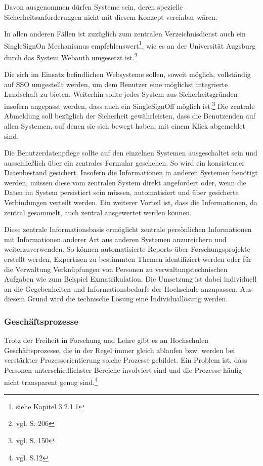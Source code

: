 Davon ausgenommen dürfen Systeme sein, deren spezielle Sicherheitsanforderungen nicht mit diesem Konzept vereinbar wären.

In allen anderen Fällen ist zuzüglich zum zentralen Verzeichnisdienst auch ein SingleSignOn Mechanismus empfehlenswert\footnote{siehe Kapitel 3.2.1.1}, wie es an der Universität Augsburg durch das System Webauth umgesetzt ist.\footnote{vgl. \cite{digicampus_2009} S. 206}

Die sich im Einsatz befindlichen Websysteme sollen, soweit möglich, vollständig auf SSO umgestellt werden, um dem Benutzer eine möglichst integrierte Landschaft zu bieten. Weiterhin sollte jedes System aus Sicherheitsgründen insofern angepasst werden, dass auch ein SingleSignOff möglich ist.\footnote{vgl. \cite{kloetgen_2012} S. 150} Die zentrale Abmeldung soll bezüglich der Sicherheit gewährleisten, dass die Benutzenden auf allen Systemen, auf denen sie sich bewegt haben, mit einem Klick abgemeldet sind.

Die Benutzerdatenpflege sollte auf den einzelnen Systemen ausgeschaltet sein und ausschließlich über ein zentrales Formular geschehen. So wird ein konsistenter Datenbestand gesichert. Insofern die Informationen in anderen Systemen benötigt werden, müssen diese vom zentralen System direkt angefordert oder, wenn die Daten im System persistiert sein müssen, automatisiert und über gesicherte Verbindungen verteilt werden. Ein weiterer Vorteil ist, dass die Informationen, da zentral gesammelt, auch zentral ausgewertet werden können.

Diese zentrale Informationsbasis ermöglicht zentrale persönlichen Informationen mit Informationen anderer Art aus anderen Systemen anzureichern und weiterzuverwenden. So können automatisierte Reports über Forschungsprojekte erstellt werden, Expertisen zu bestimmten Themen identifiziert werden oder für die Verwaltung Verknüpfungen von Personen zu verwaltungstechnischen Aufgaben wie zum Beispiel Exmatrikulation. Die Umsetzung ist dabei individuell an die Gegebenheiten und Informationsbedarfe der Hochschule anzupassen. Aus diesem Grund wird die technische Lösung eine Individuallösung werden.

\subsubsection{Geschäftsprozesse}
Trotz der Freiheit in Forschung und Lehre gibt es an Hochschulen Geschäftsprozesse, die in der Regel immer gleich ablaufen bzw. werden bei verstärkter Prozessorientierung solche Prozesse gebildet. Ein Problem ist, dass Personen unterschiedlichster Bereiche involviert sind und die Prozesse häufig nicht transparent genug sind.\footnote{vgl. \cite{becker_prozesse_2010} S.12}

